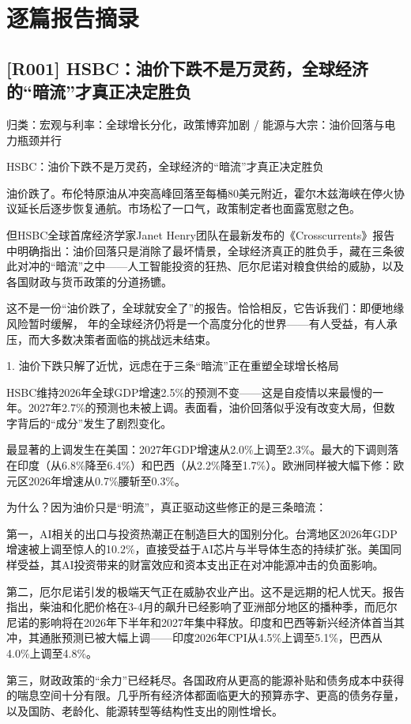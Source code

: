 \documentclass[11pt]{ctexart}
\begin{document}
\section{逐篇报告摘录}
\subsection{[R001] HSBC：油价下跌不是万灵药，全球经济的“暗流”才真正决定胜负}
{\small\color{refgray}归类：宏观与利率：全球增长分化，政策博弈加剧 / 能源与大宗：油价回落与电力瓶颈并行}

HSBC：油价下跌不是万灵药，全球经济的“暗流”才真正决定胜负

油价跌了。布伦特原油从冲突高峰回落至每桶80美元附近，霍尔木兹海峡在停火协议延长后逐步恢复通航。市场松了一口气，政策制定者也面露宽慰之色。

但HSBC全球首席经济学家Janet Henry团队在最新发布的《Crosscurrents》报告中明确指出：油价回落只是消除了最坏情景，全球经济真正的胜负手，藏在三条彼此对冲的“暗流”之中——人工智能投资的狂热、厄尔尼诺对粮食供给的威胁，以及各国财政与货币政策的分道扬镳。

这不是一份“油价跌了，全球就安全了”的报告。恰恰相反，它告诉我们：即便地缘风险暂时缓解， 年的全球经济仍将是一个高度分化的世界——有人受益，有人承压，而大多数决策者面临的挑战远未结束。

1. 油价下跌只解了近忧，远虑在于三条“暗流”正在重塑全球增长格局

HSBC维持2026年全球GDP增速2.5\%的预测不变——这是自疫情以来最慢的一年。2027年2.7\%的预测也未被上调。表面看，油价回落似乎没有改变大局，但数字背后的“成分”发生了剧烈变化。

最显著的上调发生在美国：2027年GDP增速从2.0\%上调至2.3\%。最大的下调则落在印度（从6.8\%降至6.4\%）和巴西（从2.2\%降至1.7\%）。欧洲同样被大幅下修：欧元区2026年增速从0.7\%腰斩至0.3\%。

为什么？因为油价只是“明流”，真正驱动这些修正的是三条暗流：

第一，AI相关的出口与投资热潮正在制造巨大的国别分化。台湾地区2026年GDP增速被上调至惊人的10.2\%，直接受益于AI芯片与半导体生态的持续扩张。美国同样受益，其AI投资带来的财富效应和资本支出正在对冲能源冲击的负面影响。

第二，厄尔尼诺引发的极端天气正在威胁农业产出。这不是远期的杞人忧天。报告指出，柴油和化肥价格在3-4月的飙升已经影响了亚洲部分地区的播种季，而厄尔尼诺的影响将在2026年下半年和2027年集中释放。印度和巴西等新兴经济体首当其冲，其通胀预测已被大幅上调——印度2026年CPI从4.5\%上调至5.1\%，巴西从4.0\%上调至4.8\%。

第三，财政政策的“余力”已经耗尽。各国政府从更高的能源补贴和债务成本中获得的喘息空间十分有限。几乎所有经济体都面临更大的预算赤字、更高的债务存量，以及国防、老龄化、能源转型等结构性支出的刚性增长。
\end{document}
